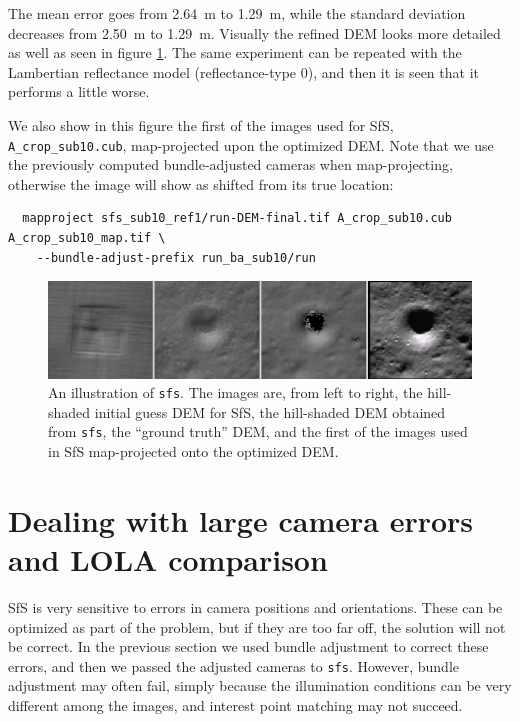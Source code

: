 The mean error goes from 2.64~m to 1.29~m, while the standard deviation
decreases from 2.50~m to 1.29~m. Visually the refined DEM looks more detailed
as well as seen in figure \ref{fig:sfs2}. The same experiment can be
repeated with the Lambertian reflectance model (reflectance-type 0), and
then it is seen that it performs a little worse. 

We also show in this figure the first of the images used for SfS,
\verb#A_crop_sub10.cub#, map-projected upon the optimized DEM. Note that
we use the previously computed bundle-adjusted cameras when
map-projecting, otherwise the image will show as shifted from its true
location:
\begin{verbatim}
  mapproject sfs_sub10_ref1/run-DEM-final.tif A_crop_sub10.cub A_crop_sub10_map.tif \
    --bundle-adjust-prefix run_ba_sub10/run
\end{verbatim}
\begin{figure}[h!]
  \begin{center}
    \includegraphics[width=7in]{images/sfs2.jpg}
    \caption[sfs]{An illustration of \texttt{sfs}. The images are, from
      left to right, the hill-shaded initial guess DEM for SfS, the hill-shaded DEM obtained
      from \texttt{sfs}, the ``ground truth'' DEM, and the first of the
      images used in SfS map-projected onto the optimized DEM.}
    \label{fig:sfs2}
  \end{center}
\end{figure}

\section{Dealing with large camera errors and LOLA comparison}
\label{sfs-lola}

SfS is very sensitive to errors in camera positions and
orientations. These can be optimized as part of the problem, but if they
are too far off, the solution will not be correct. In the previous
section we used bundle adjustment to correct these errors, and then we
passed the adjusted cameras to \texttt{sfs}. However, bundle adjustment may
often fail, simply because the illumination conditions can be very
different among the images, and interest point matching may not succeed.

